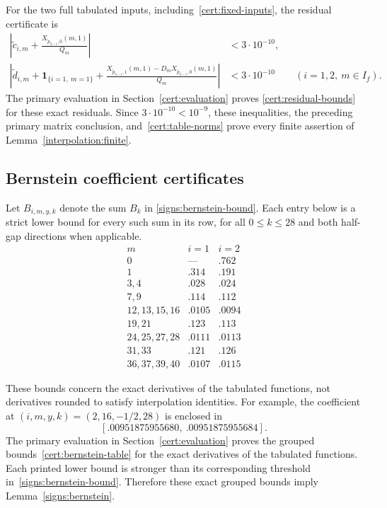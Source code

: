 For the two full tabulated inputs, including~\eqref{cert:fixed-inputs},
the residual certificate is
\begin{equation}\label{cert:residual-bounds}
\begin{aligned}
 \left|\widetilde c_{i,m}+\frac{X_{\widetilde p_{3-i},0}(m,1)}{Q_m}\right|
      &<3\cdot10^{-10},\\
 \left|\widetilde d_{i,m}+\mathbf1_{\{i=1,\ m=1\}}
       +\frac{X_{\widetilde p_{3-i},1}(m,1)
                  -D_mX_{\widetilde p_{3-i},0}(m,1)}{Q_m}\right|
      &<3\cdot10^{-10}
       \qquad(i=1,2,\ m\in I_f).
\end{aligned}
\end{equation}
The primary evaluation in Section~\ref{cert:evaluation} proves
\eqref{cert:residual-bounds} for these exact residuals.  Since
$3\cdot10^{-10}<10^{-9}$, these inequalities, the preceding primary
matrix conclusion, and~\eqref{cert:table-norms} prove every finite
assertion of Lemma~\ref{interpolation:finite}.

\subsection{Bernstein coefficient certificates}\label{cert:bernstein-bounds}

\begin{samepage}
Let $B_{i,m,y,k}$ denote the sum $B_k$ in
\eqref{signs:bernstein-bound}.  Each entry below is a strict lower bound
for every such sum in its row, for all $0\le k\le28$ and both half-gap
directions when applicable.
\begin{equation}\label{cert:bernstein-table}
\begin{array}{c|cc}
 m& i=1&i=2\\ \hline
 0&\text{---}&.762\\
 1&.314&.191\\
 3,4&.028&.024\\
 7,9&.114&.112\\
 12,13,15,16&.0105&.0094\\
 19,21&.123&.113\\
 24,25,27,28&.0111&.0113\\
 31,33&.121&.126\\
 36,37,39,40&.0107&.0115
\end{array}
\end{equation}
\end{samepage}
These bounds concern the exact derivatives of the tabulated functions,
not derivatives rounded to satisfy interpolation identities.
For example, the coefficient at $(i,m,y,k)=(2,16,-1/2,28)$ is enclosed in
\[
 [.00951875955680,\ .00951875955684].
\]
The primary evaluation in Section~\ref{cert:evaluation} proves the grouped
bounds~\eqref{cert:bernstein-table} for the exact derivatives of the tabulated
functions.  Each printed lower bound is stronger than its corresponding
threshold in~\eqref{signs:bernstein-bound}.  Therefore these exact grouped
bounds imply Lemma~\ref{signs:bernstein}.

